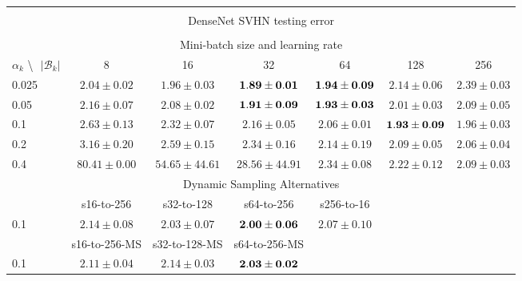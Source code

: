 \documentclass[10pt,journal,compsoc]{IEEEtran}
\begin{document}
\begin{table*}[!htbp]
\begin{center}
{\begin{tabular}{|l|c|c|c|c|c|c|}
\multicolumn{7}{|c|}{} \\
\multicolumn{7}{|c|}{DenseNet SVHN testing error} \\
\multicolumn{7}{|c|}{} \\
\hline
\multicolumn{7}{|c|}{Mini-batch size and learning rate} \\
\hline
$\alpha_k$ \textbackslash $ \text{   } {|\mathcal{B}_k|}$ & 8 & 16 & 32 & 64 & 128 & 256\\
\hline
0.025 &  $2.04\pm0.02$ & $1.96\pm0.03$ & $\bf 1.89\pm0.01$ & $\bf 1.94\pm0.09$ & $2.14\pm0.06$ & $2.39\pm0.03$  \\
\hline
0.05  & $2.16\pm0.07$ & $2.08\pm0.02$ & $\bf 1.91\pm0.09$ & $\bf 1.93\pm0.03$ & $2.01\pm0.03$ & $2.09\pm0.05$  \\
\hline
0.1   & $2.63\pm0.13$ & $2.32\pm0.07$ & $2.16\pm0.05$ & $2.06\pm0.01$ & $\bf 1.93\pm0.09$ & $1.96\pm0.03$  \\
\hline
0.2   & $3.16\pm0.20$ & $2.59\pm0.15$ & $2.34\pm0.16$ & $2.14\pm0.19$ & $2.09\pm0.05$ & $2.06\pm0.04$  \\
\hline
0.4   & $80.41\pm0.00$ & $54.65\pm44.61$ & $28.56\pm44.91$ & $2.34\pm0.08$ & $2.22\pm0.12$ & $2.09\pm0.03$ \\
\hline
\multicolumn{7}{|c|}{Dynamic Sampling Alternatives}\\
\hline
& s16-to-256  & s32-to-128 & s64-to-256 & s256-to-16 & & \\
\hline
0.1   & $2.14\pm0.08$ & $2.03\pm0.07$ & $\bf 2.00\pm0.06$ & $2.07\pm0.10$ & & \\
\hline
& s16-to-256-MS & s32-to-128-MS & s64-to-256-MS & 
& & \\
\hline
0.1 & $2.11\pm0.04$ & $2.14\pm0.03$ & $\bf 2.03\pm0.02$ & 
& & \\
\hline
\end{tabular}}
\end{center}
\end{table*}
\end{document}
